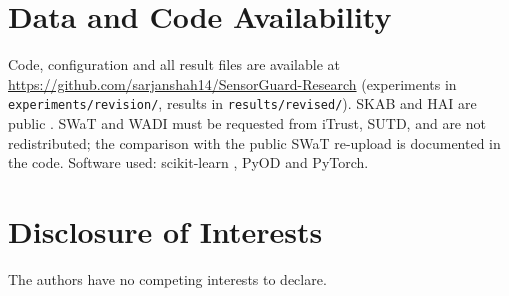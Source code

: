 \documentclass[11pt]{article}
\begin{document}
\section*{Data and Code Availability}
Code, configuration and all result files are available at
\url{https://github.com/sarjanshah14/SensorGuard-Research} (experiments in
\texttt{experiments/revision/}, results in \texttt{results/revised/}). SKAB and HAI are public
\citep{skab,shin2021}. SWaT and WADI must be requested from iTrust, SUTD, and are not
redistributed; the comparison with the public SWaT re-upload is documented in the code. Software used:
scikit-learn \citep{pedregosa2011}, PyOD \citep{zhao2019} and PyTorch.

\section*{Disclosure of Interests}
The authors have no competing interests to declare.
\end{document}
